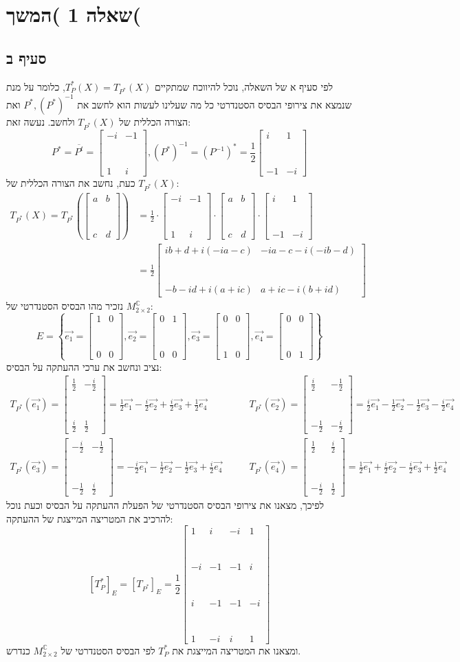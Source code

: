 \documentclass[11pt, oneside]{article}
\newcommand{\qed}{\R{$\blacksquare$}}
\newcommand{\br}{\\\\\\\\\\\\\\}
\newcommand{\mC}{\mathbb{C}}
\newcommand{\inv}[1]{#1^{-1}}
\newcommand{\conjm}[1]{#1^{*}}
\newcommand{\ctrans}[2]{\conjm{#1}_{P}(#2)}
\newcommand{\mf}[4]{\begin{bmatrix}#1 & #2\br #3 & #4\end{bmatrix}}
\begin{document}
\clearpage
\section*{שאלה 1 )המשך(}
\subsection*{סעיף ב}
לפי סעיף א של השאלה, נוכל להיווכח שמתקיים $\ctrans{T}{X} = T_{\conjm{P}}(X)$, כלומר על מנת שנמצא את צירופי הבסיס הסטנדרטי כל מה שעלינו לעשות הוא לחשב את $\conjm{P}, \inv{(\conjm{P})}$ ואת הצורה הכללית של $T_{\conjm{P}}(X)$ ולחשב. נעשה זאת:
\[
\conjm{P} = \overline{P^{t}} = \mf{-i}{-1}{1}{i}, \inv{(\conjm{P})} = \conjm{(\inv{P})} = \frac{1}{2}\mf{i}{1}{-1}{-i}
\]
כעת, נחשב את הצורה הכללית של $T_{\conjm{P}}(X)$:
\begin{align*}
T_{\conjm{P}}(X) =
T_{\conjm{P}}\left(\mf{a}{b}{c}{d}\right) &=
\frac{1}{2} \cdot \mf{-i}{-1}{1}{i} \cdot \mf{a}{b}{c}{d} \cdot \mf{i}{1}{-1}{-i}\\
&= \frac{1}{2} \mf{ib+d+i(-ia-c)}{-ia-c-i(-ib-d)}{-b-id+i(a+ic)}{a+ic-i(b+id)}
\end{align*}
נזכיר מהו הבסיס הסטנדרטי של $M^{\mC}_{2 \times 2}$:
\[
E = \left\{\vec{e_{1}} = \mf{1}{0}{0}{0}, \vec{e_{2}} = \mf{0}{1}{0}{0}, \vec{e_{3}} = \mf{0}{0}{1}{0}, \vec{e_{4}} = \mf{0}{0}{0}{1}\right\}
\]
נציב ונחשב את ערכי ההעתקה על הבסיס:
\begin{align*}
T_{\conjm{P}}(\vec{e_{1}}) = \mf{\frac{1}{2}}{-\frac{i}{2}}{\frac{i}{2}}{\frac{1}{2}} =
\frac{1}{2}\vec{e_{1}} - \frac{i}{2}\vec{e_{2}} + \frac{i}{2}\vec{e_{3}} + \frac{1}{2}\vec{e_{4}}\quad&\quad
T_{\conjm{P}}(\vec{e_{2}}) = \mf{\frac{i}{2}}{-\frac{1}{2}}{-\frac{1}{2}}{-\frac{i}{2}} =
\frac{i}{2}\vec{e_{1}} - \frac{1}{2}\vec{e_{2}} - \frac{1}{2}\vec{e_{3}} - \frac{i}{2}\vec{e_{4}}\\
T_{\conjm{P}}(\vec{e_{3}}) = \mf{-\frac{i}{2}}{-\frac{1}{2}}{-\frac{1}{2}}{\frac{i}{2}} =
-\frac{i}{2}\vec{e_{1}} - \frac{1}{2}\vec{e_{2}} - \frac{1}{2}\vec{e_{3}} + \frac{i}{2}\vec{e_{4}}\quad&\quad
T_{\conjm{P}}(\vec{e_{4}}) = \mf{\frac{1}{2}}{\frac{i}{2}}{-\frac{i}{2}}{\frac{1}{2}} =
\frac{1}{2}\vec{e_{1}} + \frac{i}{2}\vec{e_{2}} - \frac{i}{2}\vec{e_{3}} + \frac{1}{2}\vec{e_{4}}
\end{align*}
לפיכך, מצאנו את צירופי הבסיס הסטנדרטי של הפעלת ההעתקה על הבסיס וכעת נוכל להרכיב את המטריצה המייצגת של ההעתקה:
\[
[\conjm{T_{P}}]_{E} = [T_{\conjm{P}}]_{E} = \frac{1}{2}\begin{bmatrix}
1 & i & -i & 1\br
-i & -1 & -1 & i\br
i & -1 & -1 & -i\br
1 & -i & i & 1
\end{bmatrix}
\]
ומצאנו את המטריצה המייצגת את $\conjm{T_{P}}$ לפי הבסיס הסטנדרטי של $M^{\mC}_{2 \times 2}$ כנדרש.
\br\qed
\end{document}
